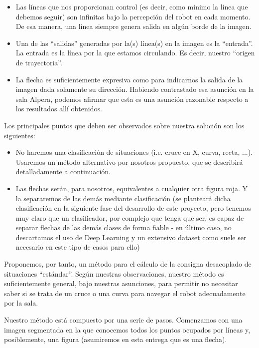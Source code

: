 \documentclass{article}
\begin{document}
    \begin{itemize}
        \item Las líneas que nos proporcionan control (es decir, como mínimo la línea que debemos seguir) son infinitas bajo la percepción del robot en cada momento. De esa manera, una línea siempre genera salida en algún borde de la imagen.
        \item Una de las ``salidas'' generadas por la(s) línea(s) en la imagen es la ``entrada''. La entrada es la línea por la que estamos circulando. Es decir, nuestro ``origen de trayectoria''.
        \item La flecha es suficientemente expresiva como para indicarnos la salida de la imagen dada solamente su dirección. Habiendo contrastado esa asunción en la sala Alpera, podemos afirmar que esta es una asunción razonable respecto a los resultados allí obtenidos.
    \end{itemize}

    Los principales puntos que deben ser observados sobre nuestra solución son los siguientes:
    \begin{itemize}
        \item No haremos una clasificación de situaciones (i.e. cruce en X, curva, recta, ...). Usaremos un método alternativo por nosotros propuesto, que se describirá detalladamente a continuación.
        \item Las flechas serán, para nosotros, equivalentes a cualquier otra figura roja. Y la separaremos de las demás mediante clasificación (se planteará dicha clasificación en la siguiente fase del desarrollo de este proyecto, pero tenemos muy claro que un clasificador, por complejo que tenga que ser, es capaz de separar flechas de las demás clases de forma fiable - en último caso, no descartamos el uso de Deep Learning y un extensivo dataset como suele ser necesario en este tipo de casos para ello)
    \end{itemize}

    Proponemos, por tanto, un método para el cálculo de la consigna desacoplado de situaciones ``estándar''. Según nuestras observaciones, nuestro método es suficientemente general, bajo nuestras asunciones, para permitir no necesitar saber si se trata de un cruce o una curva para navegar el robot adecuadamente por la sala. 

    Nuestro método está compuesto por una serie de pasos. Comenzamos con una imagen segmentada en la que conocemos todos los puntos ocupados por líneas y, posiblemente, una figura (asumiremos en esta entrega que es una flecha).
\end{document}
